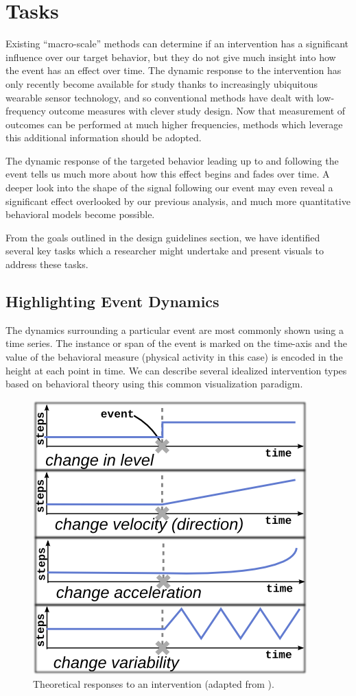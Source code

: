\section{Tasks}
Existing ``macro-scale'' methods can determine if an intervention has a significant influence over our target behavior, but they do not give much insight into how the event has an effect over time.
The dynamic response to the intervention has only recently become available for study thanks to increasingly ubiquitous wearable sensor technology, and so conventional methods have dealt with low-frequency outcome measures with clever study design.
Now that measurement of outcomes can be performed at much higher frequencies, methods which leverage this additional information should be adopted.

The dynamic response of the targeted behavior leading up to and following the event tells us much more about how this effect begins and fades over time.
A deeper look into the shape of the signal following our event may even reveal a significant effect overlooked by our previous analysis, and much more quantitative behavioral models become possible.

From the goals outlined in the design guidelines section, we have identified several key tasks which a researcher might undertake and present visuals to address these tasks.

\subsection{Highlighting Event Dynamics}
The dynamics surrounding a particular event are most commonly shown using a time series.
The instance or span of the event is marked on the time-axis and the value of the behavioral measure (physical activity in this case) is encoded in the height at each point in time.
We can describe several idealized intervention types based on behavioral theory using this common visualization paradigm.

\begin{figure}
\centering
\includegraphics[width=0.6\columnwidth]{./img/exampleDynamicSignals.png}
\caption{Theoretical responses to an intervention (adapted from \cite{glass1975}).}
\label{fig:exampleSignals}
\end{figure}

